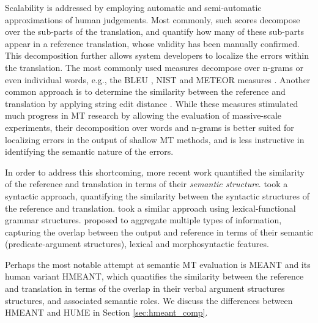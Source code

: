 \documentclass[11pt]{article}
\newcommand{\secref}[1]{Section \ref{#1}}
\begin{document}
Scalability is addressed by employing automatic and semi-automatic approximations of human
judgements. Most commonly, such scores decompose over the sub-parts of
the translation, and quantify how many of these sub-parts appear in a reference translation,
whose validity has been manually confirmed. This decomposition further allows system developers
to localize the errors within the translation.
The most commonly used measures decompose over n-grams or even individual words, e.g., 
the BLEU \cite{Papineni:2002}, NIST \cite{Doddington:2002} and METEOR measures \cite{Banerjee:2005}.
Another common approach is to determine the similarity between the reference and translation
by applying string edit distance \cite{snover2006study}.
While these measures stimulated much progress in MT research by allowing
the evaluation of massive-scale experiments,
their decomposition over words and n-grams is better suited for localizing errors
in the output of shallow MT methods, and is less instructive in identifying the semantic
nature of the errors. 


In order to address this shortcoming, more recent work quantified
the similarity of the reference and translation in terms
of their {\it semantic structure}.  took a syntactic approach, 
quantifying the similarity between the syntactic structures of the reference and translation.
 took a similar approach using lexical-functional grammar structures.
 proposed to aggregate multiple types of information,
capturing the overlap between the output and reference in terms of their
semantic (predicate-argument structures), lexical and morphosyntactic features.

Perhaps the most notable attempt at semantic MT evaluation is MEANT and
its human variant HMEANT, which quantifies the similarity between
the reference and translation in terms of the overlap in
their verbal argument structures structures, and associated semantic roles.
We discuss the differences between HMEANT and HUME in \secref{sec:hmeant_comp}.
\end{document}
